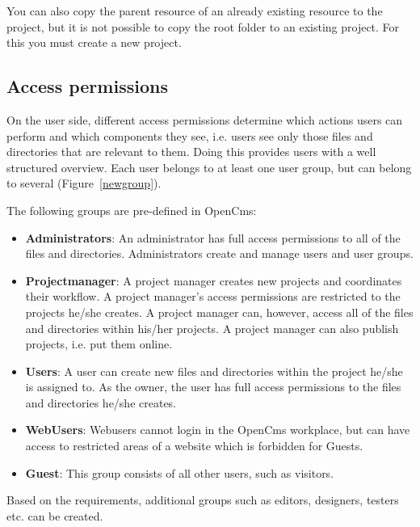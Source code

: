 \begin{itemize}
You can also copy the parent resource of an already existing
resource to the project, but it is not possible to copy the root
folder to an existing project. For this you must create a new
project.

\end{itemize}

\subsection{Access permissions}

On the user side, different access permissions determine which
actions users can perform and which components they see, i.e.
users see only those files and directories that are relevant to
them. Doing this provides users with a well structured overview.
Each user belongs to at least one user group, but can belong to
several (Figure~\ref{newgroup}).

The following groups are pre-defined in OpenCms:

\begin{itemize}
\item \textbf{Administrators}: An administrator has full access permissions to
all of the files and directories. Administrators create and manage
users and user groups.
\item \textbf{Projectmanager}: A project manager creates new projects and coordinates their workflow. A project manager's access permissions are restricted to the projects he/she creates. A project manager can, however, access all of the files and directories within his/her projects. A project manager can also publish projects, i.e. put them online.
\item \textbf{Users}: A user can create new files and directories within the project he/she is assigned to. As the owner, the user has full access permissions to the files and directories he/she creates.
\item \textbf{WebUsers}: Webusers cannot login in the OpenCms workplace, but can have access to restricted areas of a website which is forbidden for Guests.
\item \textbf{Guest}: This group consists of all other users, such as visitors.
\end{itemize}

Based on the requirements, additional groups such as editors,
designers, testers etc. can be created.

